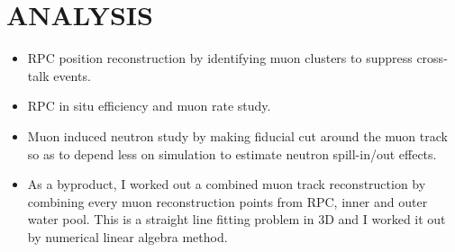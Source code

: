 \documentclass[10pt]{article}
\begin{document}
\section*{ANALYSIS}
\begin{itemize}
	\item RPC position reconstruction by identifying muon clusters to suppress cross-talk events.
	\item RPC in situ efficiency and muon rate study.
	\item Muon induced neutron study by making fiducial cut around the muon track so as to depend less on simulation to estimate neutron spill-in/out effects.
	\item As a byproduct, I worked out a combined muon track reconstruction by combining every muon reconstruction points from RPC, inner and outer water pool. This is a straight line fitting problem in 3D and I worked it out by numerical linear algebra method.
\end{itemize}
\end{document}
